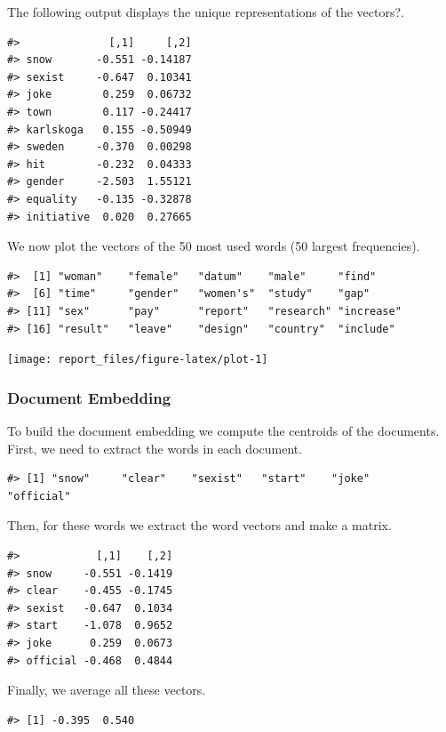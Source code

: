 \documentclass[
]{article}
\begin{document}
The following output displays the unique representations of the
vectors?.

\begin{verbatim}
#>              [,1]     [,2]
#> snow       -0.551 -0.14187
#> sexist     -0.647  0.10341
#> joke        0.259  0.06732
#> town        0.117 -0.24417
#> karlskoga   0.155 -0.50949
#> sweden     -0.370  0.00298
#> hit        -0.232  0.04333
#> gender     -2.503  1.55121
#> equality   -0.135 -0.32878
#> initiative  0.020  0.27665
\end{verbatim}

We now plot the vectors of the 50 most used words (50 largest
frequencies).

\begin{verbatim}
#>  [1] "woman"    "female"   "datum"    "male"     "find"    
#>  [6] "time"     "gender"   "women's"  "study"    "gap"     
#> [11] "sex"      "pay"      "report"   "research" "increase"
#> [16] "result"   "leave"    "design"   "country"  "include"
\end{verbatim}

\begin{center}\texttt{[image: report\_files/figure-latex/plot-1]} \end{center}

\hypertarget{document-embedding}{%
\subsubsection{Document Embedding}\label{document-embedding}}

To build the document embedding we compute the centroids of the
documents. First, we need to extract the words in each document.

\begin{verbatim}
#> [1] "snow"     "clear"    "sexist"   "start"    "joke"     "official"
\end{verbatim}

Then, for these words we extract the word vectors and make a matrix.

\begin{verbatim}
#>            [,1]    [,2]
#> snow     -0.551 -0.1419
#> clear    -0.455 -0.1745
#> sexist   -0.647  0.1034
#> start    -1.078  0.9652
#> joke      0.259  0.0673
#> official -0.468  0.4844
\end{verbatim}

Finally, we average all these vectors.

\begin{verbatim}
#> [1] -0.395  0.540
\end{verbatim}
\end{document}
